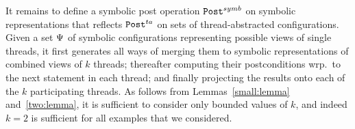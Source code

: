 It remains to define a symbolic post operation ${\tt Post}^{symb}$ on symbolic
representations that reflects 
${\tt Post}^{ta}$ on sets of thread-abstracted configurations.
Given a set $\Psi$ of symbolic
configurations representing possible views of single threads,
it first generates all ways of merging them to symbolic representations 
of combined views of $k$ threads;
thereafter computing their postconditions
wrp.\ to the next statement in each thread; and finally
projecting the results onto each of the $k$ participating threads.
As follows from Lemmas~\ref{small:lemma} and~\ref{two:lemma}, it is sufficient
to consider only bounded values of $k$, and indeed $k=2$ is sufficient
for all examples that we considered.

